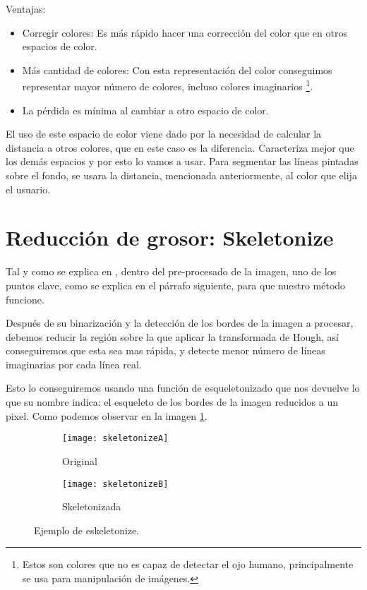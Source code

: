 Ventajas:
\begin{itemize}
\item Corregir colores: Es más rápido hacer una corrección del color que en otros espacios de color.
\item Más cantidad de colores: Con esta representación del color conseguimos representar mayor número de colores, incluso colores imaginarios \footnote{Estos son colores que no es capaz de detectar el ojo humano, principalmente se usa para manipulación de imágenes.}.
\item La pérdida es mínima al cambiar a otro espacio de color.
\end{itemize}

El uso de este espacio de color viene dado por la necesidad de calcular la distancia a otros colores, que en este caso es la diferencia. Caracteriza mejor que los demás espacios y por esto lo vamos a usar.
Para segmentar las líneas pintadas sobre el fondo, se usara la distancia, mencionada anteriormente, al color que elija el usuario.

\section{Reducción de grosor: Skeletonize}
Tal y como se explica en \cite{scik:skeleton}, dentro del pre-procesado de la imagen, uno de los puntos clave, como se explica en el párrafo siguiente, para que nuestro método funcione.

Después de su binarización y la detección de los bordes de la imagen a procesar, debemos reducir la región sobre la que aplicar la transformada de Hough, así conseguiremos que esta sea mas rápida, y detecte menor número de líneas imaginarias por cada línea real.

Esto lo conseguiremos usando una función de esqueletonizado que nos devuelve lo que su nombre indica: el esqueleto de los bordes de la imagen reducidos a un pixel. Como podemos observar en la imagen \ref{fig:3.6}.


\begin{figure}
\begin{subfigure}[b]{.5\linewidth}
\centering\large \texttt{[image: skeletonizeA]}
\caption{Original}
\end{subfigure}%
\begin{subfigure}[b]{.5\linewidth}
\centering\large \texttt{[image: skeletonizeB]}
\caption{Skeletonizada}
\end{subfigure}
\caption{Ejemplo de eskeletonize.}\label{fig:3.6}
\end{figure}


